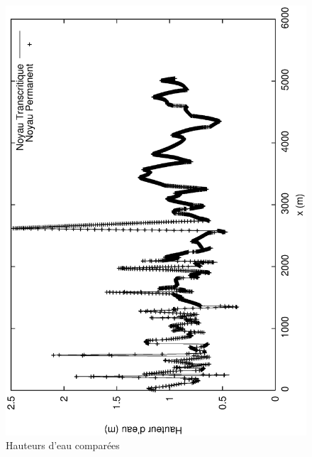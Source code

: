 \documentclass[a4paper,10pt]{article}
\begin{document}
\begin{figure}
 \begin{center}
  \includegraphics[angle=270,width=15cm]{H_Tr_Pr.eps}
  \caption{Hauteurs d'eau comparées}
  \label{fig3}
 \end{center}
\end{figure}
\end{document}
